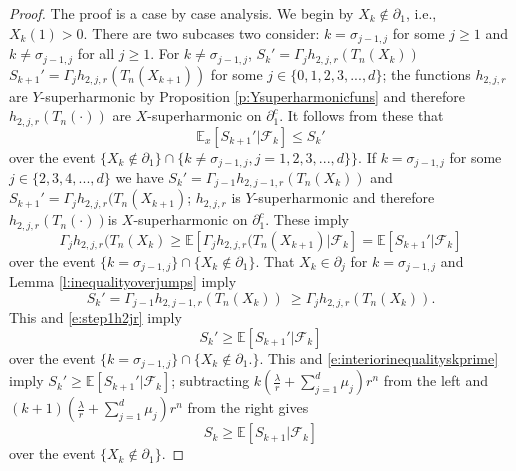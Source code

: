 \documentclass[11pt,a4paper]{article}
\begin{document}
\begin{proof}
The proof is a case by case analysis. We begin by $X_k \notin \partial_1$,
i.e., $X_k(1) > 0.$ There are two subcases two consider:
$k = \sigma_{j-1,j}$ for some $j \ge 1$ and 
$k \neq \sigma_{j-1,j}$ for all $j \ge 1$.
For 
$k \neq \sigma_{j-1,j}$, 
$S_k' = \Gamma_j h_{2,j,r}(T_n(X_k))$ 
$S_{k+1}' = \Gamma_j h_{2,j,r}(T_n(X_{k+1}))$ 
for some $j \in \{0,1,2,3,...,d\}$;
the functions $h_{2,j,r}$ are $Y$-superharmonic by Proposition
\ref{p:Ysuperharmonicfuns} and therefore 
$h_{2,j,r}(T_n(\cdot))$ are $X$-superharmonic on $\partial_1^c.$
It follows from these that
\begin{equation}\label{e:interiorinequalityskprime}
{\mathbb E}_x[S_{k+1}' | {\mathscr F}_k] \le S_k'
\end{equation}
over the event 
$\{ X_k \notin \partial_1\} \cap \{k \neq \sigma_{j-1,j}, j=1,2,3,...,d\}\}.$
If $k = \sigma_{j-1,j}$ for some $j \in \{2,3,4,...,d\}$ we have
$S_k' = \Gamma_{j-1}h_{2,j-1,r}(T_n(X_k))$
and $S_{k+1}' = \Gamma_j h_{2,j,r}(T_n(X_{k+1})$; $h_{2,j,r}$  is $Y$-superharmonic
and therefore $h_{2,j,r}(T_n(\cdot))$is $X$-superharmonic on $\partial_1^c$.
These imply
\begin{equation}\label{e:step1h2jr}
\Gamma_j h_{2,j,r}(T_n(X_{k}) \ge
{\mathbb E}[\Gamma_j h_{2,j,r}(T_n(X_{k+1}) |{\mathscr F}_k] =
{\mathbb E}[S_{k+1}' |{\mathscr F}_k] 
\end{equation}
over the event $\{k = \sigma_{j-1,j}\} \cap \{ X_k \notin \partial_1\}.$
That $X_{k} \in \partial_j$ for $k=\sigma_{j-1,j}$
and Lemma \ref{l:inequalityoverjumps}
imply
\[
S_{k}'=\Gamma_{j-1} h_{2,j-1,r}(T_n(X_{k}))\ 
\ge \Gamma_j h_{2,j,r}(T_n(X_k)).
\]
This and \eqref{e:step1h2jr} imply
\[
S_k' \ge {\mathbb E}[S_{k+1}' |{\mathscr F}_k] 
\]
over the event $\{k = \sigma_{j-1,j}\} \cap \{ X_k \notin \partial_1.\}.$
This and \eqref{e:interiorinequalityskprime} imply
$S_k' \ge {\mathbb E}[S_{k+1}' |{\mathscr F}_k]$;
subtracting 
$k\left( \frac{\lambda}{r} + \sum_{j=1}^d \mu_j \right) r^n$
from the left and 
$(k+1)\left( \frac{\lambda}{r} + \sum_{j=1}^d \mu_j \right) r^n$
from the right gives
\[
S_k \ge {\mathbb E}[S_{k+1} |{\mathscr F}_k] 
\]
over the event $\{X_k \notin \partial_1\}$. 


\end{proof}
\end{document}
